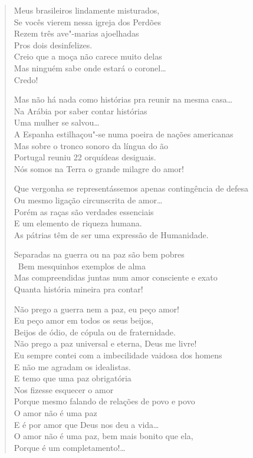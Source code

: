 \begin{verse}
Meus brasileiros lindamente misturados,\\
Se vocês vierem nessa igreja dos Perdões\\
Rezem três ave"-marias ajoelhadas\\
Pros dois desinfelizes.\\
Creio que a moça não carece muito delas\\
Mas ninguém sabe onde estará o coronel\ldots{}\\
Credo!

Mas não há nada como histórias pra reunir na mesma casa\ldots{}\\
Na Arábia por saber contar histórias\\
Uma mulher se salvou\ldots{}\\
A Espanha estilhaçou"-se numa poeira de nações americanas\\
Mas sobre o tronco sonoro da língua do ão\\
Portugal reuniu 22 orquídeas desiguais.\\
Nós somos na Terra o grande milagre do amor!

Que vergonha se representássemos apenas contingência de defesa\\
Ou mesmo ligação circunscrita de amor\ldots{}\\
Porém as raças são verdades essenciais\\
E um elemento de riqueza humana.\\
As pátrias têm de ser uma expressão de Humanidade.

Separadas na guerra ou na paz são bem pobres\\\
Bem mesquinhos exemplos de alma\\
Mas compreendidas juntas num amor consciente e exato\\
Quanta história mineira pra contar!

Não prego a guerra nem a paz, eu peço amor!\\
Eu peço amor em todos os seus beijos,\\
Beijos de ódio, de cópula ou de fraternidade.\\
Não prego a paz universal e eterna, Deus me livre!\\
Eu sempre contei com a imbecilidade vaidosa dos homens\\
E não me agradam os idealistas.\\
E temo que uma paz obrigatória\\
Nos fizesse esquecer o amor\\
Porque mesmo falando de relações de povo e povo\\
O amor não é uma paz\\
E é por amor que Deus nos deu a vida\ldots{}\\
O amor não é uma paz, bem mais bonito que ela,\\
Porque é um completamento!\ldots{}


\end{verse}
